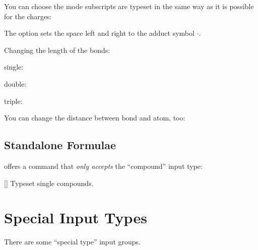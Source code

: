 \documentclass[load-preamble+]{cnltx-doc}
\begin{document}
You can choose the mode subscripts are typeset in the same way as it is
possible for the charges:
\begin{example}
    \par
   
\end{example}

The option  sets the space left and right to the adduct
symbol $\cdot$.
\begin{example}
   \par
\end{example}

Changing the length of the bonds:
\begin{example}
  single:  \par
  double:  \par
  triple: 
\end{example}

You can change the distance between bond and atom, too:
\begin{example}
   \par
\end{example}

\subsection{Standalone Formulae}
\chemformula{} offers a command that \emph{only accepts} the
\enquote{compound} input type:
\begin{commands}
  []
    Typeset single compounds.
\end{commands}

\section{Special Input Types}
There are some \enquote{special type} input groups.
\end{document}
